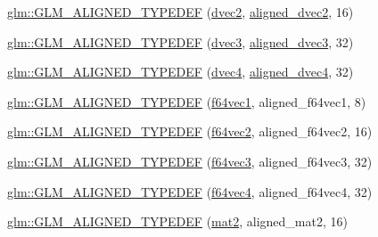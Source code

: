 \begin{DoxyCompactItemize}
\item 
\mbox{\hyperlink{group__gtx__type__aligned_ga78bfec2f185d1d365ea0a9ef1e3d45b8}{glm\+::\+G\+L\+M\+\_\+\+A\+L\+I\+G\+N\+E\+D\+\_\+\+T\+Y\+P\+E\+D\+EF}} (\mbox{\hyperlink{group__core__types_gae6727259898288cae197724d5f172b3b}{dvec2}}, \mbox{\hyperlink{group__gtc__type__aligned_ga1e6972e837bc34b3424af8d63a71d7c6}{aligned\+\_\+dvec2}}, 16)
\item 
\mbox{\hyperlink{group__gtx__type__aligned_ga01fe6fee6db5df580b6724a7e681f069}{glm\+::\+G\+L\+M\+\_\+\+A\+L\+I\+G\+N\+E\+D\+\_\+\+T\+Y\+P\+E\+D\+EF}} (\mbox{\hyperlink{group__core__types_ga7f3287f952e6ccb481231368091702ac}{dvec3}}, \mbox{\hyperlink{group__gtc__type__aligned_ga82da11893fbac3bda647c9de9da62693}{aligned\+\_\+dvec3}}, 32)
\item 
\mbox{\hyperlink{group__gtx__type__aligned_ga687d5b8f551d5af32425c0b2fba15e99}{glm\+::\+G\+L\+M\+\_\+\+A\+L\+I\+G\+N\+E\+D\+\_\+\+T\+Y\+P\+E\+D\+EF}} (\mbox{\hyperlink{group__core__types_ga0824ceed7ec3b2fba89765501c1540b5}{dvec4}}, \mbox{\hyperlink{group__gtc__type__aligned_ga502d8d084a488118c9a5466d73ba1a46}{aligned\+\_\+dvec4}}, 32)
\item 
\mbox{\hyperlink{group__gtx__type__aligned_ga8e842371d46842ff8f1813419ba49d0f}{glm\+::\+G\+L\+M\+\_\+\+A\+L\+I\+G\+N\+E\+D\+\_\+\+T\+Y\+P\+E\+D\+EF}} (\mbox{\hyperlink{group__gtc__type__precision_ga4c945cd13adbebd25ea3df003efb92ef}{f64vec1}}, aligned\+\_\+f64vec1, 8)
\item 
\mbox{\hyperlink{group__gtx__type__aligned_ga32814aa0f19316b43134fc25f2aad2b9}{glm\+::\+G\+L\+M\+\_\+\+A\+L\+I\+G\+N\+E\+D\+\_\+\+T\+Y\+P\+E\+D\+EF}} (\mbox{\hyperlink{group__gtc__type__precision_gacde4fe7b129521888cd30672c34650c5}{f64vec2}}, aligned\+\_\+f64vec2, 16)
\item 
\mbox{\hyperlink{group__gtx__type__aligned_gaf3d3bbc1e93909b689123b085e177a14}{glm\+::\+G\+L\+M\+\_\+\+A\+L\+I\+G\+N\+E\+D\+\_\+\+T\+Y\+P\+E\+D\+EF}} (\mbox{\hyperlink{group__gtc__type__precision_gac531875c6544b7919f36a86cbe538736}{f64vec3}}, aligned\+\_\+f64vec3, 32)
\item 
\mbox{\hyperlink{group__gtx__type__aligned_ga804c654cead1139bd250f90f9bb01fad}{glm\+::\+G\+L\+M\+\_\+\+A\+L\+I\+G\+N\+E\+D\+\_\+\+T\+Y\+P\+E\+D\+EF}} (\mbox{\hyperlink{group__gtc__type__precision_ga9d896f484039b22873e7bfb9e06f7b47}{f64vec4}}, aligned\+\_\+f64vec4, 32)
\item 
\mbox{\hyperlink{group__gtx__type__aligned_gafed7d010235a3aa7ea2f88646858f2ae}{glm\+::\+G\+L\+M\+\_\+\+A\+L\+I\+G\+N\+E\+D\+\_\+\+T\+Y\+P\+E\+D\+EF}} (\mbox{\hyperlink{group__core__types_ga8357ec0aab6f8cf69313592492663c3f}{mat2}}, aligned\+\_\+mat2, 16)

\end{DoxyCompactItemize}
